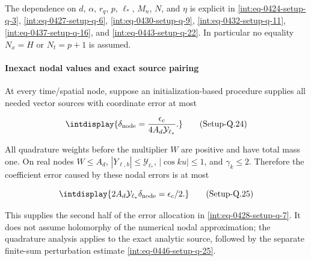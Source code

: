 
The dependence on \(d\), \(\alpha\), \(r_q\), \(p\), \(\ell_*\), \(M_n\), \(N\), and \(\eta\) is explicit in \hyperref[int:eq-setup-q-3]{\eqref{int:eq-0424-setup-q-3}}, \hyperref[int:eq-setup-q-6]{\eqref{int:eq-0427-setup-q-6}}, \hyperref[int:eq-setup-q-9]{\eqref{int:eq-0430-setup-q-9}}, \hyperref[int:eq-setup-q-11]{\eqref{int:eq-0432-setup-q-11}}, \hyperref[int:eq-setup-q-16]{\eqref{int:eq-0437-setup-q-16}}, and \hyperref[int:eq-setup-q-22]{\eqref{int:eq-0443-setup-q-22}}. In particular no equality \(N_x=H\) or \(N_t=p+1\) is assumed.


\paragraph{Inexact nodal values and exact source pairing}
\label{int:setup-quadrature-4}
\mbox{}\par\smallskip


At every time/spatial node, suppose an initialization-based procedure supplies all needed vector sources with coordinate error at most


\label{int:eq-setup-q-24}
\begingroup\renewcommand{\theHequation}{intdisplay.897}
\begin{equation}
\intdisplay{
\delta_{\rm node}=
\frac{\epsilon_c}{4A_d\mathcal Y_{\ell_*}}.
}
\tag{Setup-Q.24}
\label{int:eq-0445-setup-q-24}
\end{equation}
\endgroup


All quadrature weights before the multiplier \(W\) are positive and have total mass one. On real nodes \(W\le A_d\), \(|Y_{\ell,\allowbreak b}|\le\mathcal Y_{\ell_*}\), \(|\cos ku|\le1\), and \(\gamma_k\le2\). Therefore the coefficient error caused by these nodal errors is at most


\label{int:eq-setup-q-25}
\begingroup\renewcommand{\theHequation}{intdisplay.898}
\begin{equation}
\intdisplay{
2A_d\mathcal Y_{\ell_*}\delta_{\rm node}=\epsilon_c/2.
}
\tag{Setup-Q.25}
\label{int:eq-0446-setup-q-25}
\end{equation}
\endgroup


This supplies the second half of the error allocation in \hyperref[int:eq-setup-q-7]{\eqref{int:eq-0428-setup-q-7}}. It does not assume holomorphy of the numerical nodal approximation; the quadrature analysis applies to the exact analytic source, followed by the separate finite-sum perturbation estimate \hyperref[int:eq-setup-q-25]{\eqref{int:eq-0446-setup-q-25}}.



